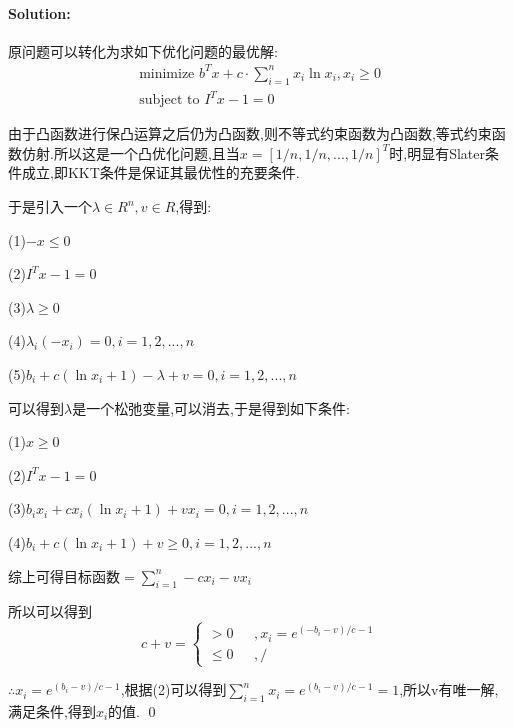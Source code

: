 \documentclass[a4paper]{ctexart}
\newenvironment{solution}
{\color{blue} \paragraph{Solution:\\}}
{\newline \qed}
\begin{document}
\begin{solution}
    原问题可以转化为求如下优化问题的最优解:
    \begin{align*}
        \text{minimize }b^Tx+c\cdot\sum_{i=1}^{n}x_i\ln x_i,x_i\geq 0 \\
        \text{subject to }I^Tx-1=0
    \end{align*}

    由于凸函数进行保凸运算之后仍为凸函数,则不等式约束函数为凸函数,等式约束函数仿射.所以这是一个凸优化问题,且当$x=[1/n,1/n,...,1/n]^T$时,明显有Slater条件成立,即KKT条件是保证其最优性的充要条件.

    于是引入一个$\lambda \in R^n,v\in R$,得到:

    (1)$-x\leq 0$

    (2)$I^Tx-1=0$

    (3)$\lambda \geq 0$

    (4)$\lambda_i(-x_i)=0,i=1,2,...,n$

    (5)$b_i+c(\ln x_i+1)-\lambda+v=0,i=1,2,...,n$

    可以得到$\lambda$是一个松弛变量,可以消去,于是得到如下条件:

    (1)$x\geq 0$

    (2)$I^Tx-1=0$

    (3)$b_ix_i+cx_i(\ln x_i+1)+vx_i=0,i=1,2,...,n$

    (4)$b_i+c(\ln x_i+1)+v\geq 0,i=1,2,...,n$

    综上可得目标函数$=\sum_{i=1}^{n}-cx_i-vx_i$

    所以可以得到
    $$c+v=
        \begin{cases}
            >0     & \text{  },x_i=e^{(-b_i-v)/c-1} \\
            \leq 0 & \text{  },/
        \end{cases}$$

    $\therefore x_i=e^{(b_i-v)/c-1}$,根据(2)可以得到$\sum_{i=1}^{n}x_i=e^{(b_i-v)/c-1}=1$,所以v有唯一解,满足条件,得到$x_i$的值.
\end{solution}
\end{document}
